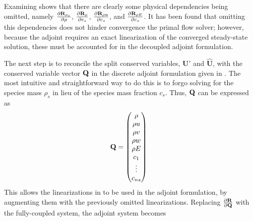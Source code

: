 Examining  shows that there are clearly some
physical dependencies being omitted, namely $\frac{\partial \mathbf R_{\rho_s}}{\partial \rho}$,
$\frac{\partial \mathbf R_{\rho}}{\partial c_s}$, $\frac{\partial \mathbf R_{\rho \mathbf u}}{\partial c_s}$, and $\frac{\partial \mathbf R_{\rho E}}{\partial c_s}$.  It has
been found\cite{candler} that omitting this dependencies does not hinder convergence
the primal flow solver; however, because the adjoint requires an exact
linearization of the converged steady-state solution, these must be accounted
for in the decoupled adjoint formulation.

The next step is to reconcile the split conserved variables, $\mathbf{U}'$ and
$\mathbf{\hat{U}}$, with the conserved variable vector $\mathbf Q$ in the discrete
adjoint formulation given in . The most intuitive and
straightforward way to do this is to forgo solving for the species mass $\rho_s$
in lieu of the species mass fraction $c_s$.  Thus, $\mathbf Q$ can be expressed as
\begin{equation}
  \mathbf Q =
  \begin{pmatrix}
  	\rho \\
  	\rho u \\
  	\rho v \\
  	\rho w \\
  	\rho E \\
    c_1 \\
    \vdots \\
    c_{ns}
  \end{pmatrix}
  \label{q-vec}
\end{equation}
This allows the linearizations in  to be used
in the adjoint formulation, by augmenting them with the previously omitted
linearizations.  Replacing $\frac{\partial \mathbf R_{}}{\partial \mathbf Q}$ with the fully-coupled system, the
adjoint system becomes

